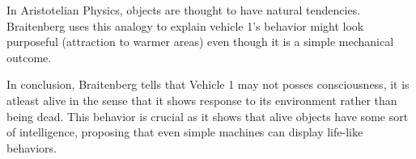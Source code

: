 \documentclass{article}
\begin{document}
In Aristotelian Physics, objects are thought to have natural tendencies. Braitenberg uses this analogy to explain vehicle 1's behavior might look purposeful (attraction to warmer areas) even though it is a simple mechanical outcome.

In conclusion, Braitenberg tells that Vehicle 1 may not posses consciousness, it is atleast alive in the sense that it shows response to its environment rather than being dead. This behavior is crucial as it shows that alive objects have some sort of intelligence, proposing that even simple machines can display life-like behaviors.



\end{document}
